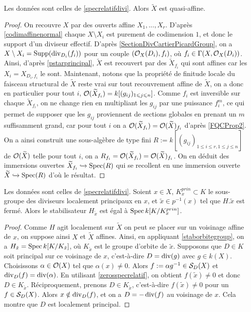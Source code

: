 \begin{cor}\label{specrelatifQuasiAff}
Les données sont celles de \ref{specrelatifdivi}. Alors $\widetilde{X}$ est quasi-affine.
\end{cor}
\begin{proof}
On recouvre $X$ par des ouverts affine $X_1,...,X_r$. D'après \ref{codimaffinenormal} chaque $X\setminus X_i$ est purement de codimension $1$, et donc le support d'un diviseur effectif. D'après \ref{SectionDivCartierPicardGroup}, on a $X\setminus X_i=\operatorname{Supp}(\operatorname{div}_{D_i}(f_i))$ pour un couple $(\mathcal{O}_X(D_i),f_i)$, où $f_i\in\Gamma(X,\mathcal{O}_X(D_i))$. Ainsi, d'après \ref{pstarprincipal}, $\widetilde{X}$ est recouvert par des $\widetilde{X}_{f_i}$ qui sont affines car les $X_i=X_{D_i,f_i}$ le sont. Maintenant, notons que la propriété de finitude locale du faisceau structural de $\widetilde{X}$ reste vrai sur tout recouvrement affine de $\widetilde{X}$, on a donc en particulier pour tout $i$, $\mathcal{O}(\widetilde{X}_{f_i})=k[(g_{ij})_{1\leqslant j\leqslant n}]$. Comme $f_i$ est inversible sur chaque $\widetilde{X}_{f_i}$, on ne change rien en multipliant les $g_{ij}$ par une puissance $f_i^m$, ce qui permet de supposer que les $g_{ij}$ proviennent de sections globales en prenant un $m$ suffisamment grand, car pour tout $i$ on a $\mathcal{O}({\widetilde{X}_{f_i}})=\mathcal{O}({\widetilde{X}})_{f_i}$ d'après \ref{FQCProp2}. On a ainsi construit une sous-algèbre de type fini $R:=k[(g_{ij})_{1\leq i\leq r, 1\leq j\leq n}]$ de $\mathcal{O}(\widetilde{X})$ telle pour tout $i$, on a $R_{f_i}=\mathcal{O}({\widetilde{X}_{f_i}})=\mathcal{O}({\widetilde{X}})_{f_i}$. On en déduit des immersions ouvertes $\widetilde{X}_{f_i}\xhookrightarrow{} \operatorname{Spec}(R)$ qui se recollent en une immersion ouverte $\widetilde{X}\xhookrightarrow{} \operatorname{Spec}(R)$ d'où le résultat.
\end{proof}

\begin{cor}
Les données sont celles de \ref{specrelatifdivi}. Soient $x\in X$, $K_x^{prin}\subset K$ le sous-groupe des diviseurs localement principaux en $x$, et $\tilde{x}\in p^{-1}(x)$ tel que $H.\tilde{x}$ est fermé. Alors le stabilisateur $H_{\tilde{x}}$ est égal à $\operatorname{Spec} k[K/K_x^{prin}]$.
\end{cor}
\begin{proof}
Comme $H$ agit localement sur $\widetilde{X}$ on peut se placer sur un voisinage affine de $x$, on suppose ainsi $X$ et $\widetilde{X}$ affines. Ainsi, en appliquant \ref{staborbitegroup}, on a $H_{\tilde{x}}=\operatorname{Spec} k[K/K_{\tilde{x}}]$, où $K_{\tilde{x}}$ est le groupe d'orbite de $\tilde{x}$. Supposons que $D\in K$ soit principal sur ce voisinage de $x$, c'est-à-dire $D=\operatorname{div}(g)$ avec $g\in k(X)$. Choisissons $\alpha \in \mathcal{O}(X)$ tel que $\alpha(x)\neq 0$. Alors $f:=\alpha g^{-1}\in \mathcal{S}_D(X)$ et $\operatorname{div}_D(f)=\operatorname{div}(\alpha)$. En utilisant \ref{zerosspecrelatif}, on obtient $f(\tilde{x})\neq 0$ et donc $D\in K_{\tilde{x}}$. Réciproquement, prenons $D\in K_{\tilde{x}}$, c'est-à-dire $f(\tilde{x})\neq 0$ pour un $f\in \mathcal{S}_D(X)$. Alors $x\notin \operatorname{div}_D(f)$, et on a $D=-\operatorname{div}(f)$ au voisinage de $x$. Cela montre que $D$ est localement principal.
\end{proof}




